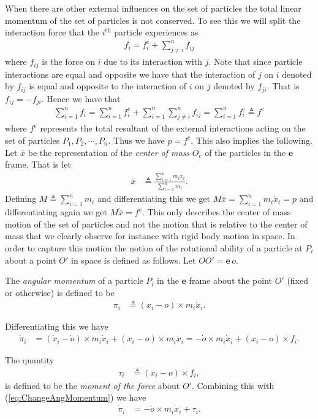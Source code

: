 \documentclass[graybox,envcountchap,sectrefs]{svmonoMuga}
\begin{document}
When there are other external influences on the set of particles the total linear momentum of the set of particles is not conserved. To see this we will split the interaction force that the $i^{\mathrm{th}}$ particle experiences as 
\begin{align*}
f_i=f_i^e+\sum_{j\neq i}^nf_{ij}
\end{align*}
where $f_{ij}$ is the force on $i$ due to its interaction with $j$.
Note that since particle interactions are equal and opposite we have that the interaction of $j$ on $i$ denoted by $f_{ij}$ is equal and opposite to the interaction of $i$ on $j$ denoted by $f_{ji}$. That is $f_{ij}=-f_{ji}$. Hence we have that
\begin{align*}
\sum_{i=1}^nf_i=\sum_{i=1}^nf_i^e+\sum_{i=1}^n\sum_{j\neq i}^nf_{ij}= \sum_{i=1}^nf_i^e\triangleq f^e
\end{align*}
where $f^e$ represents the total resultant of the external interactions acting on the set of particles $P_1,P_2,\cdots,P_n$.
Thus we have $\dot{p}=f^e$.
This also implies the following. Let $\bar{x}$ be the representation of the \emph{center of mass} $O_c$ of the particles in the $\mathbf{e}$ frame.
That is let
\begin{align}
\bar{x}&\triangleq \frac{\sum_{i=1}^{n}m_ix_i}{\sum_{i=1}^{n}m_i}.
\end{align}
Defining $M\triangleq \sum_{i=1}^{n}m_i$ and
differentiating this we get
$M\dot{\bar{x}}= {\sum_{i=1}^{n}m_i\dot{x}_i}= {p}$
and differentiating again 
we get $M\ddot{\bar{x}}= f^e$.
This only describes the center of mass motion of the set of particles and not the motion that is relative to the center of mass that we clearly observe for instance with rigid body motion in space. In order to capture this motion the notion of the rotational ability of a particle at $P_i$ about a point $O'$ in space is defined as follows. 
Let $OO'=\mathbf{e}\,o$.
\begin{svgraybox}
The \textit{angular momentum} of a particle $P_i$ in the $\mathbf{e}$ frame about the point $O'$ (fixed or otherwise) is defined to be
\begin{align}
\pi_i &\triangleq (x_i-o)\times m_i\dot{x}_i.\label{eq:AngularMomentum_i}
\end{align}
\end{svgraybox}
Differentiating this we have 
\begin{align}
\dot{\pi}_i&= (\dot{x}_i-\dot{o})\times m_i\dot{x}_i+(x_i-o)\times m_i\ddot{x}_i=-\dot{o}\times m_i\dot{x}_i+(x_i-o)\times f_i.\label{eq:ChangeAngMomentum}
\end{align}
\begin{svgraybox}
The quantity 
\begin{align}
\tau_i &\triangleq (x_i-o)\times f_i,\label{eq:ForceMomentum}
\end{align} 
is defined to be the \textit{moment of the force} about $O'$. Combining this with (\ref{eq:ChangeAngMomentum}) we have
\begin{align}
\dot{\pi}_i&= -\dot{o}\times m_i\dot{x}_i+\tau_i.\label{eq:ChangeAngMomentum1}
\end{align}
\end{svgraybox}
\end{document}
